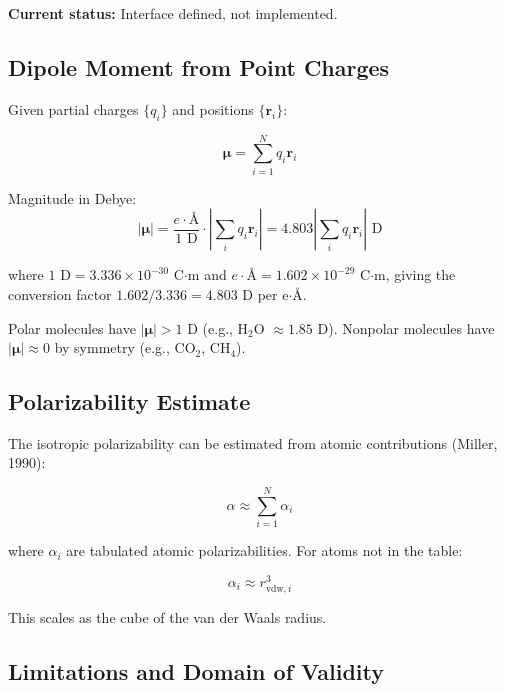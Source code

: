 \documentclass[11pt]{article}
\begin{document}
\textbf{Current status:} Interface defined, not implemented.

\subsection{Dipole Moment from Point Charges}

Given partial charges $\{q_i\}$ and positions $\{\mathbf{r}_i\}$:

\begin{equation}
\boldsymbol{\mu} = \sum_{i=1}^{N} q_i \mathbf{r}_i
\end{equation}

Magnitude in Debye:
\begin{equation}
|\boldsymbol{\mu}| = \frac{e \cdot \text{\AA}}{1 \text{ D}} \cdot \left|\sum_i q_i \mathbf{r}_i\right| = 4.803 \left|\sum_i q_i \mathbf{r}_i\right| \text{ D}
\end{equation}

where $1\text{ D} = 3.336 \times 10^{-30}$ C$\cdot$m and $e \cdot \text{\AA} = 1.602 \times 10^{-29}$ C$\cdot$m, giving the conversion factor $1.602/3.336 = 4.803$ D per e$\cdot$\AA.

Polar molecules have $|\boldsymbol{\mu}| > 1$ D (e.g., H$_2$O $\approx 1.85$ D). Nonpolar molecules have $|\boldsymbol{\mu}| \approx 0$ by symmetry (e.g., CO$_2$, CH$_4$).

\subsection{Polarizability Estimate}

The isotropic polarizability can be estimated from atomic contributions (Miller, 1990):

\begin{equation}
\alpha \approx \sum_{i=1}^{N} \alpha_i
\end{equation}

where $\alpha_i$ are tabulated atomic polarizabilities. For atoms not in the table:

\begin{equation}
\alpha_i \approx r_{\text{vdw},i}^3
\end{equation}

This scales as the cube of the van der Waals radius.

\subsection{Limitations and Domain of Validity}
\end{document}
